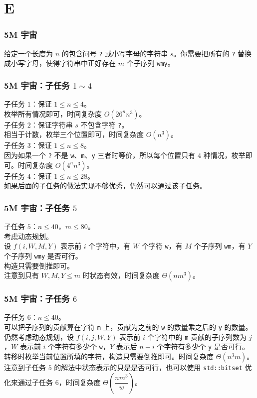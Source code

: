 \documentclass{beamer}
\begin{document}
\section{E}

\begin{frame}
\frametitle{5M 宇宙}
给定一个长度为 $n$ 的包含问号 \texttt{?} 或小写字母的字符串 $s$。你需要把所有的 \texttt{?} 替换成小写字母，使得字符串中正好存在 $m$ 个子序列 \texttt{wmy}。
\end{frame}

\begin{frame}
\frametitle{5M 宇宙：子任务 $1 \sim 4$}
子任务 $1$：保证 $1 \leq n \leq 4$。\\
\pause
枚举所有情况即可，时间复杂度 $O(26^n n^3)$。\\
\pause
子任务 $2$：保证字符串 $s$ 不包含字符 \texttt{?}。\\
\pause
相当于计数，枚举三个位置即可，时间复杂度 $O(n^3)$。\\
\pause
子任务 $3$：保证 $1 \leq n \leq 8$。\\
\pause
因为如果一个 \texttt{?} 不是 \texttt{w}、\texttt{m}、\texttt{y} 三者时等价，所以每个位置只有 $4$ 种情况，枚举即可。时间复杂度 $O(4^n n^3)$。\\
\pause
子任务 $4$：保证 $1 \leq n \leq 28$。\\
\pause
如果后面的子任务的做法实现不够优秀，仍然可以通过该子任务。
\end{frame}

\begin{frame}
\frametitle{5M 宇宙：子任务 $5$}
子任务 $5$：$n \leq 40$，$m \leq 80$。\\
\pause
考虑动态规划。\\
\pause
设 $f(i,W,M,Y)$ 表示前 $i$ 个字符中，有 $W$ 个字符 \texttt{w}，有 $M$ 个子序列 \texttt{wm}，有 $Y$ 个子序列 \texttt{wmy} 是否可行。\\
\pause
构造只需要倒推即可。\\
\pause
注意到只有 $W,M,Y \leq m$ 时状态有效，时间复杂度 $\Theta(n m^3)$。
\end{frame}

\begin{frame}
\frametitle{5M 宇宙：子任务 $6$}
子任务 $6$：$n \leq 40$。\\
\pause
可以把子序列的贡献算在字符 \texttt{m} 上，贡献为之前的 \texttt{w} 的数量乘之后的 \texttt{y} 的数量。\\
\pause
仍然考虑动态规划，设 $f(i, j, W, Y)$ 表示前 $i$ 个字符中的 \texttt{m} 贡献的子序列数为 $j$，$W$ 表示前 $i$ 个字符有多少个 \texttt{w}，$Y$ 表示后 $n-i$ 个字符有多少个 \texttt{y} 是否可行。转移时枚举当前位置所填的字符，构造只需要倒推即可。时间复杂度 $\Theta(n^3 m)$。\\
\pause
注意到子任务 $5$ 的解法中状态表示的只是是否可行，也可以使用 \texttt{std::bitset} 优化来通过子任务 $6$，时间复杂度 $\Theta\left(\dfrac{n m^3}{w}\right)$。
\end{frame}
\end{document}
